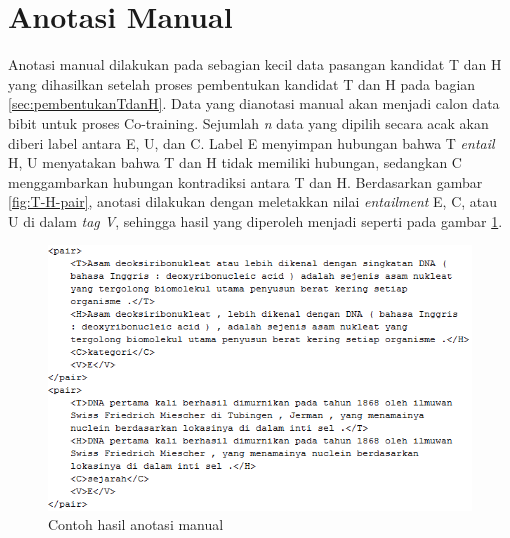 \section{Anotasi Manual}
Anotasi manual dilakukan pada sebagian kecil data pasangan kandidat T dan H yang dihasilkan setelah proses pembentukan kandidat T dan H pada bagian \ref{sec:pembentukanTdanH}. Data yang dianotasi manual akan menjadi calon data bibit untuk proses Co-training. Sejumlah \textit{n} data yang dipilih secara acak akan diberi label antara E, U, dan C. Label E menyimpan hubungan bahwa T \textit{entail} H, U menyatakan bahwa T dan H tidak memiliki hubungan, sedangkan C menggambarkan hubungan kontradiksi antara T dan H. Berdasarkan gambar \ref{fig:T-H-pair}, anotasi dilakukan dengan meletakkan nilai \textit{entailment} E, C, atau U di dalam \textit{tag V}, sehingga hasil yang diperoleh menjadi seperti pada gambar \ref{fig:hasil-anotasi-manual}.
\begin{figure}
	\centering
	\includegraphics[width=0.85\linewidth]{pics/hasil-anotasi-manual}
	\caption{Contoh hasil anotasi manual}
	\label{fig:hasil-anotasi-manual}
\end{figure}

